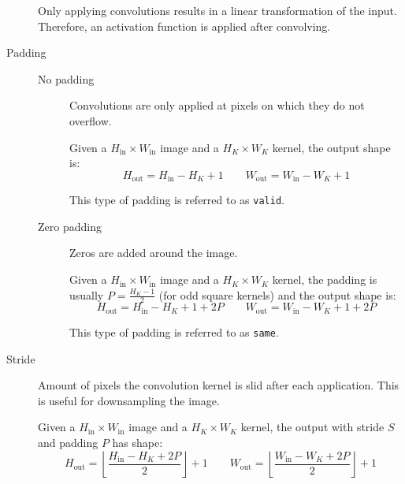 \begin{description}
        \begin{remark}
            Only applying convolutions results in a linear transformation of the input. Therefore, an activation function is applied after convolving.
        \end{remark}

    \item[Padding] 
        \phantom{}
        \begin{description}
            \item[No padding] 
                Convolutions are only applied at pixels on which they do not overflow.

                Given a $H_\text{in} \times W_\text{in}$ image and a $H_K \times W_K$ kernel,
                the output shape is:
                \[ H_\text{out} = H_\text{in} - H_K + 1 \hspace{2em} W_\text{out} = W_\text{in} - W_K + 1 \]

                \begin{remark}
                    This type of padding is referred to as \texttt{valid}.
                \end{remark}

            \item[Zero padding] 
                Zeros are added around the image.

                Given a $H_\text{in} \times W_\text{in}$ image and a $H_K \times W_K$ kernel,
                the padding is usually $P=\frac{H_K-1}{2}$ (for odd square kernels) and the output shape is:
                \[ H_\text{out} = H_\text{in} - H_K + 1 + 2P \hspace{2em} W_\text{out} = W_\text{in} - W_K + 1 + 2P \]

                \begin{remark}
                    This type of padding is referred to as \texttt{same}.
                \end{remark}
        \end{description}

        
    \item[Stride] 
        Amount of pixels the convolution kernel is slid after each application. This is useful for downsampling the image.

        Given a $H_\text{in} \times W_\text{in}$ image and a $H_K \times W_K$ kernel,
        the output with stride $S$ and padding $P$ has shape:
        \[ 
            H_\text{out} = \left\lfloor \frac{H_\text{in} - H_K + 2P}{2} \right\rfloor + 1
            \hspace{2em} 
            W_\text{out} = \left\lfloor \frac{W_\text{in} - W_K + 2P}{2} \right\rfloor + 1
        \]
        

\end{description}
